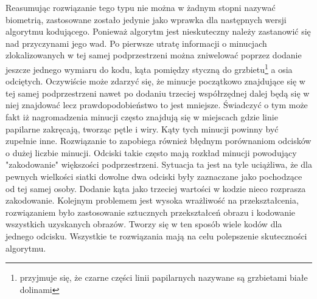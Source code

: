 \vspace{.5cm}\par

Reasumując rozwiązanie tego typu nie można w żadnym stopni nazywać biometrią, zastosowane zostało jedynie jako wprawka dla następnych wersji algorytmu kodującego.
Ponieważ algorytm jest nieskuteczny należy zastanowić się nad przyczynami jego wad. Po pierwsze utratę informacji o minucjach zlokalizowanych w tej samej podprzestrzeni można zniwelować poprzez dodanie 
jeszcze jednego wymiaru do kodu, kąta pomiędzy styczną do grzbietu\footnote{przyjmuje się, że czarne części linii papilarnych nazywane są grzbietami białe dolinami} a osia odciętych. Oczywiście może zdarzyć się, że
minucje początkowo znajdujące się w tej samej podprzestrzeni nawet po dodaniu trzeciej współrzędnej dalej będą się w niej znajdować lecz prawdopodobieństwo to jest mniejsze. Świadczyć o tym może fakt iż
nagromadzenia minucji często znajdują się w miejscach gdzie linie papilarne zakręcają, tworząc pętle i wiry. Kąty tych minucji powinny być zupełnie inne. Rozwiązanie to zapobiega również błędnym 
porównaniom odcisków o dużej liczbie minucji. Odciski takie często mają rozkład minucji powodujący "zakodowanie" większości podprzestrzeni. Sytuacja ta jest na tyle uciążliwa, że dla pewnych wielkości siatki
dowolne dwa odciski były zaznaczane jako pochodzące od tej samej osoby. Dodanie kąta jako trzeciej wartości w kodzie nieco rozprasza zakodowanie. Kolejnym problemem jest wysoka wrażliwość na przekształcenia,
rozwiązaniem było zastosowanie sztucznych przekształceń obrazu i kodowanie wszystkich uzyskanych obrazów. Tworzy się w ten sposób wiele kodów dla jednego odcisku. Wszystkie te rozwiązania mają na celu 
polepszenie skuteczności algorytmu.

